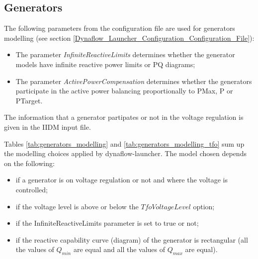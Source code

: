 \documentclass[a4paper, 12pt]{report}
\begin{document}
\subsection{Generators}

The following parameters from the configuration file are used for generators modelling (see section \ref{Dynaflow_Launcher_Configuration_Configuration_File}):
\begin{itemize}
  \item The parameter \textit{InfiniteReactiveLimits} determines whether the generator models have infinite reactive power limits or PQ diagrams;
  \item The parameter \textit{ActivePowerCompensation} determines whether the generators participate in the active power balancing proportionally to PMax, P or PTarget.
\end{itemize}

The information that a generator partipates or not in the voltage regulation is given in the IIDM input file.

\par Tables \ref{tab:generators_modelling} and \ref{tab:generators_modelling_tfo} sum up the modelling choices applied by dynaflow-launcher.
The model chosen depends on the following:
\begin{itemize}
  \item if a generator is on voltage regulation or not and where the voltage is controlled;
  \item if the voltage level is above or below the $TfoVoltageLevel$ option;
  \item if the InfiniteReactiveLimits parameter is set to true or not;
  \item if the reactive capability curve (diagram) of the generator is rectangular (all the values of $Q_{min}$ are equal and all the values of $Q_{max}$ are equal).
\end{itemize}
\end{document}
